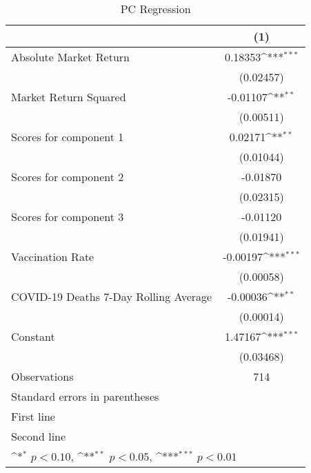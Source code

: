 \begin{table}[htbp]\centering
\def\sym#1{\ifmmode^{#1}\else\(^{#1}\)\fi}
\caption{PC Regression \label{reg2}}
\begin{tabular}{l*{1}{c}}
\toprule
                    &\multicolumn{1}{c}{(1)}         \\
\midrule
Absolute Market Return&     0.18353\sym{***}\\
                    &   (0.02457)         \\
\addlinespace
Market Return Squared&    -0.01107\sym{**} \\
                    &   (0.00511)         \\
\addlinespace
Scores for component 1&     0.02171\sym{**} \\
                    &   (0.01044)         \\
\addlinespace
Scores for component 2&    -0.01870         \\
                    &   (0.02315)         \\
\addlinespace
Scores for component 3&    -0.01120         \\
                    &   (0.01941)         \\
\addlinespace
Vaccination Rate    &    -0.00197\sym{***}\\
                    &   (0.00058)         \\
\addlinespace
COVID-19 Deaths 7-Day Rolling Average&    -0.00036\sym{**} \\
                    &   (0.00014)         \\
\addlinespace
Constant            &     1.47167\sym{***}\\
                    &   (0.03468)         \\
\midrule
Observations        &         714         \\
\bottomrule
\multicolumn{2}{l}{\footnotesize Standard errors in parentheses}\\
\multicolumn{2}{l}{\footnotesize First line}\\
\multicolumn{2}{l}{\footnotesize Second line}\\
\multicolumn{2}{l}{\footnotesize \sym{*} \(p<0.10\), \sym{**} \(p<0.05\), \sym{***} \(p<0.01\)}\\
\end{tabular}
\end{table}
